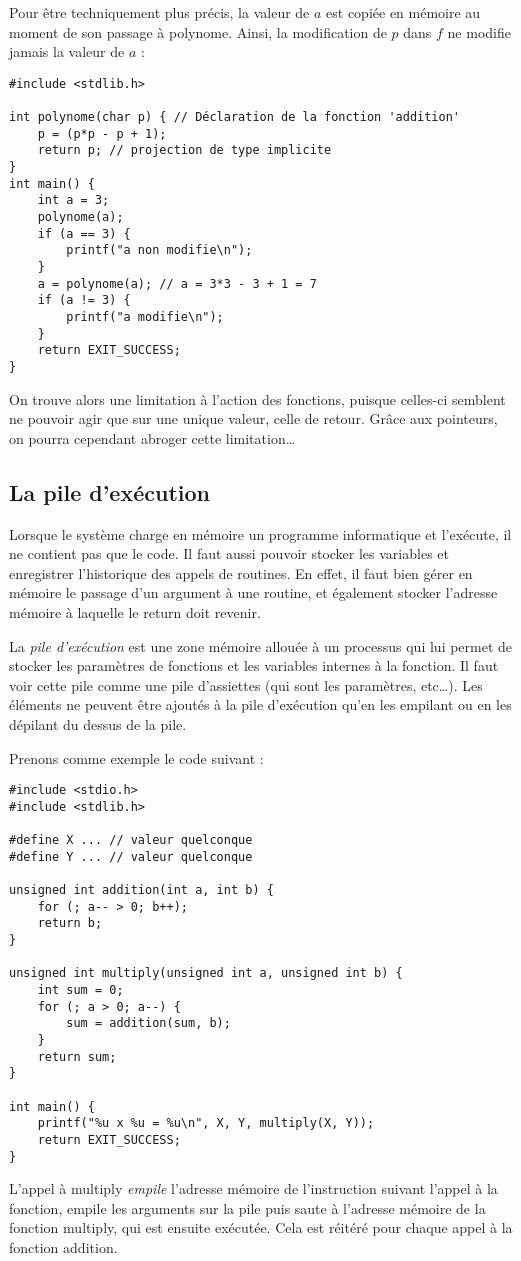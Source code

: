 \documentclass[../../../main.tex]{subfiles}
\begin{document}
Pour être techniquement plus précis, la valeur de $a$ est copiée en mémoire au moment de son passage à \textsf{polynome}. Ainsi, la modification de $p$ dans $f$ ne modifie jamais la valeur de $a$ :
\begin{verbatim}
#include <stdlib.h>

int polynome(char p) { // Déclaration de la fonction 'addition'
	p = (p*p - p + 1);
	return p; // projection de type implicite
}
int main() {
	int a = 3;
	polynome(a);
	if (a == 3) {
		printf("a non modifie\n");
	}
	a = polynome(a); // a = 3*3 - 3 + 1 = 7
	if (a != 3) {
		printf("a modifie\n");
	}
	return EXIT_SUCCESS;
}
\end{verbatim}
On trouve alors une limitation à l'action des fonctions, puisque celles-ci semblent ne pouvoir agir que sur une unique valeur, celle de retour. Grâce aux pointeurs, on pourra cependant abroger cette limitation\dots
\subsection{La pile d'exécution}
\label{sub:la_pile_d_ex_cution}
Lorsque le système charge en mémoire un programme informatique et l'exécute, il ne contient pas que le code. Il faut aussi pouvoir stocker les variables et enregistrer l'historique des appels de routines. En effet, il faut bien	gérer en mémoire le passage d'un argument à une routine, et également stocker l'adresse mémoire à laquelle le \textsf{return} doit revenir.

La \textit{pile d'exécution} est une zone mémoire allouée à un processus qui lui permet de stocker les paramètres de fonctions et les variables internes à la fonction. Il faut voir cette pile comme une pile d'assiettes (qui sont les paramètres, etc\dots). Les éléments ne peuvent être ajoutés à la pile d'exécution qu'en les empilant ou en les dépilant du dessus de la pile.

Prenons comme exemple le code suivant :
\begin{verbatim}
#include <stdio.h>
#include <stdlib.h>

#define X ... // valeur quelconque
#define Y ... // valeur quelconque

unsigned int addition(int a, int b) {
	for (; a-- > 0; b++);
	return b;
}

unsigned int multiply(unsigned int a, unsigned int b) {
	int sum = 0;
	for (; a > 0; a--) {
		sum = addition(sum, b);
	}
	return sum;
}

int main() {
	printf("%u x %u = %u\n", X, Y, multiply(X, Y));
	return EXIT_SUCCESS;
}
\end{verbatim} 
L'appel à \textsf{multiply} \textit{empile} l'adresse mémoire de l'instruction suivant l'appel à la fonction, empile les arguments sur la pile puis saute à l'adresse mémoire de la fonction \textsf{multiply}, qui est ensuite exécutée. Cela est réitéré pour chaque appel à la fonction \textsf{addition}.
 
\end{document}
